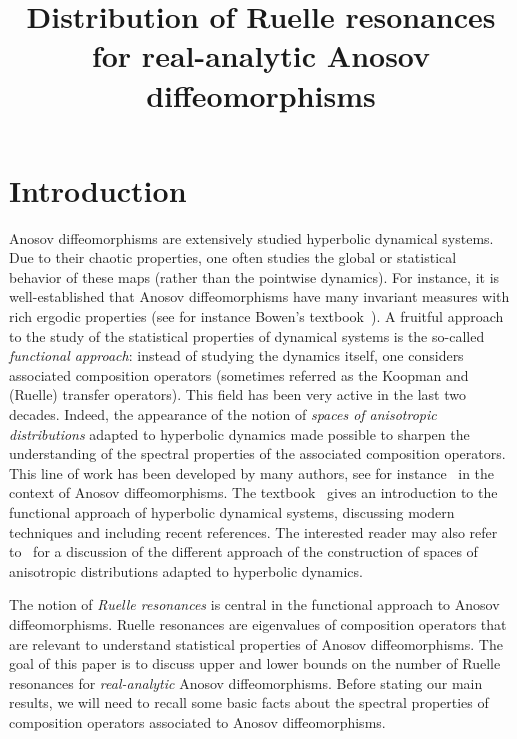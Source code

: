 \documentclass[AHL,Unicode,longabstracts,published]{cedram}
\title[Distribution of Ruelle resonances]{Distribution of Ruelle resonances for real-analytic Anosov diffeomorphisms}
\author[\initial{M.} \lastname{Jézéquel}]{\firstname{Malo} \lastname{Jézéquel}}
\begin{document}
\maketitle

\section{Introduction}

Anosov diffeomorphisms are extensively studied hyperbolic dynamical systems. Due to their chaotic properties, one often studies the global or statistical behavior of these maps (rather than the pointwise dynamics). For instance, it is well-established that Anosov diffeomorphisms have many invariant measures with rich ergodic properties (see for instance Bowen's textbook~\cite{bowen_book}). A fruitful approach to the study of the statistical properties of dynamical systems is the so-called \emph{functional approach}: instead of studying the dynamics itself, one considers associated composition operators (sometimes referred as the Koopman and (Ruelle) transfer operators). This field has been very active in the last two decades. Indeed, the appearance of the notion of \emph{spaces of anisotropic distributions} adapted to hyperbolic dynamics made possible to sharpen the understanding of the spectral properties of the associated composition operators. This line of work has been developed by many authors, see for instance~\cite{blank_keller_liverani, baladi_tsujii, baladi_tsujii_determinant, faure_roy_sjostrand,
gouezel_liverani_1, gouezel_liverani_2} in the context of Anosov diffeomorphisms. The textbook~\cite{baladi_book} gives an introduction to the functional approach of hyperbolic dynamical systems, discussing modern techniques and including recent references. The interested reader may also refer to~\cite{baladi_quest} for a discussion of the different approach of the construction of spaces of anisotropic distributions adapted to hyperbolic dynamics.

The notion of \emph{Ruelle resonances} is central in the functional approach to Anosov diffeomorphisms. Ruelle resonances are eigenvalues of composition operators that are relevant to understand statistical properties of Anosov diffeomorphisms. The goal of this paper is to discuss upper and lower bounds on the number of Ruelle resonances for \emph{real-analytic} Anosov diffeomorphisms. Before stating our main results, we will need to recall some basic facts about the spectral properties of composition operators associated to Anosov diffeomorphisms.
\end{document}
